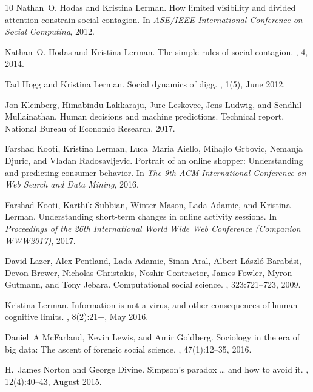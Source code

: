 \documentclass{svjour3}
\begin{document}
\begin{thebibliography}{10}
Nathan~O. Hodas and Kristina Lerman.
\newblock How limited visibility and divided attention constrain social
  contagion.
\newblock In {\em ASE/IEEE International Conference on Social Computing}, 2012.

Nathan~O. Hodas and Kristina Lerman.
\newblock The simple rules of social contagion.
, 4, 2014.

Tad Hogg and Kristina Lerman.
\newblock Social dynamics of digg.
, 1(5), June 2012.

Jon Kleinberg, Himabindu Lakkaraju, Jure Leskovec, Jens Ludwig, and Sendhil
  Mullainathan.
\newblock Human decisions and machine predictions.
\newblock Technical report, National Bureau of Economic Research, 2017.

Farshad Kooti, Kristina Lerman, Luca~Maria Aiello, Mihajlo Grbovic, Nemanja
  Djuric, and Vladan Radosavljevic.
\newblock Portrait of an online shopper: Understanding and predicting consumer
  behavior.
\newblock In {\em The 9th ACM International Conference on Web Search and Data
  Mining}, 2016.

Farshad Kooti, Karthik Subbian, Winter Mason, Lada Adamic, and Kristina Lerman.
\newblock Understanding short-term changes in online activity sessions.
\newblock In {\em Proceedings of the 26th International World Wide Web
  Conference (Companion WWW2017)}, 2017.

David Lazer, Alex Pentland, Lada Adamic, Sinan Aral, Albert-L\'{a}szl\'{o}
  Barab\'{a}si, Devon Brewer, Nicholas Christakis, Noshir Contractor, James
  Fowler, Myron Gutmann, and Tony Jebara.
\newblock Computational social science.
, 323:721--723, 2009.

Kristina Lerman.
\newblock Information is not a virus, and other consequences of human cognitive
  limits.
, 8(2):21+, May 2016.

Daniel~A McFarland, Kevin Lewis, and Amir Goldberg.
\newblock Sociology in the era of big data: The ascent of forensic social
  science.
, 47(1):12--35, 2016.

H.~James Norton and George Divine.
\newblock Simpson's paradox … and how to avoid it.
, 12(4):40--43, August 2015.


\end{thebibliography}
\end{document}
